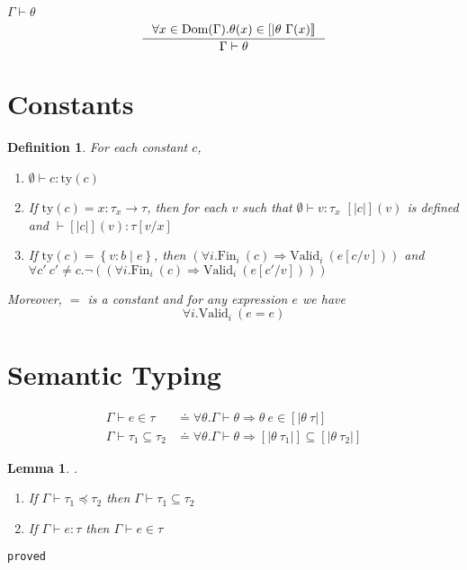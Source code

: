 \documentclass[10pt,a4paper]{article}
\newtheorem{definition}{Definition}
\newtheorem{lemma}{Lemma}
\newcommand\showproof[1]{\texttt{proved}}
\newcommand\tref[3]{\ensuremath{\left\lbrace #1 \colon #2 \mid #3 \right\rbrace}}
\newcommand\tfun[3]{\ensuremath{#1\colon #2 \rightarrow #3}}
\newcommand\validi[1]{\ensuremath{\text{Valid}_{i}\ (#1)}}
\newcommand\fini[1]{\ensuremath{\text{Fin}_{i}\ (#1)}}
\newcommand\generalconditionInterp[2]
	{\ensuremath{(\forall i. \fini{#1} \Rightarrow \validi{#2})}}
\newcommand\generalconditionImplOne[1]
	{\ensuremath{\forall i . \validi{#1}}}
\newcommand\ty[1]{\ensuremath{\text{ty}({#1})}}
\newcommand\sub[2]{\ensuremath{\left[ #2 / #1 \right]}}
\newcommand\interp[1]{\ensuremath{[|#1|]}}
\newcommand\hastype[3]{\ensuremath{#1 \vdash #2 \colon #3}}
\newcommand\shastype[3]{\ensuremath{#1 \vdash #2 \in #3}}
\newcommand\iswellformed[2]{\ensuremath{#1 \vdash #2}}
\newcommand\issubtype[3]{\ensuremath{#1 \vdash #2 \preceq #3}}
\newcommand\sissubtype[3]{\ensuremath{#1 \vdash #2 \subseteq #3}}
\begin{document}
\hfill\mbox{\iswellformed{\Gamma}{\theta}}
$$
\inference{
	\forall x \in \text{Dom}(\Gamma). 
	\theta(x) \in \interp{\theta \ \Gamma(x)}
}{
	\iswellformed{\Gamma}{\theta}
}
$$


\section*{Constants}
\begin{definition}\label{def:constants}
For each constant $c$, 
\begin{enumerate}
\item \hastype{\emptyset}{c}{\ty{c}}
\item If $\ty{c} = \tfun{x}{\tau_x}{\tau}$, then for each $v$ such that
\hastype{\emptyset}{v}{\tau_x} $\interp{c}(v)$ is defined and
\hastype{}{\interp{c}(v)}{\tau\sub{x}{v}}
\item If $\ty{c} = \tref{v}{b}{e}$, 
then \generalconditionInterp{c}{e\sub{v}{c}} and 
$\forall c'\ c' \neq c. \lnot (\generalconditionInterp{c}{e\sub{v}{c'}})$ 
\end{enumerate}
Moreover, $=$ is a constant and for any expression $e$ we have 
$$\generalconditionImplOne{e = e}$$
\end{definition}

\section*{Semantic Typing}
\begin{align*}
\shastype{\Gamma}{e}{\tau} & \doteq
	\forall \theta . \iswellformed{\Gamma}{\theta} \Rightarrow \theta\ e \in \interp{\theta \ \tau}\\
\sissubtype{\Gamma}{\tau_1}{\tau_2} & \doteq 
	\forall \theta . \iswellformed{\Gamma}{\theta} \Rightarrow \interp{\theta\ \tau_1} \subseteq \interp{\theta\ \tau_2}
\end{align*}


\begin{lemma}.
\begin{enumerate}
\item If \issubtype{\Gamma}{\tau_1}{\tau_2} then \sissubtype{\Gamma}{\tau_1}{\tau_2} 
\item If \hastype{\Gamma}{e}{\tau} then \shastype{\Gamma}{e}{\tau} 
\end{enumerate}
\end{lemma}
\showproof{
	\begin{proof}
	
	\end{proof}
}
\end{document}
